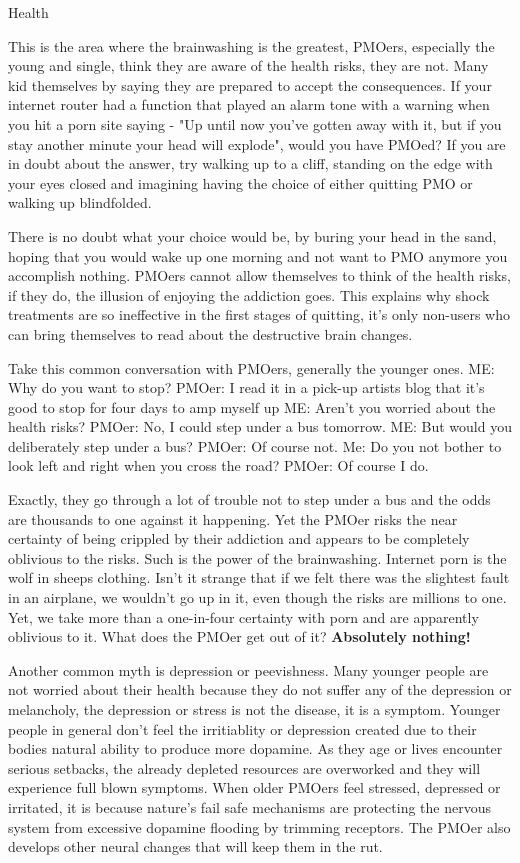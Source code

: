 Health

This is the area where the brainwashing is the greatest, PMOers, especially the young and single, think they are aware of the health risks, they are not. Many kid themselves by saying they are prepared to accept the consequences. If your internet router had a function that played an alarm tone with a warning when you hit a porn site saying - "Up until now you've gotten away with it, but if you stay another minute your head will explode", would you have PMOed? If you are in doubt about the answer, try walking up to a cliff, standing on the edge with your eyes closed and imagining having the choice of either quitting PMO or walking up blindfolded.

There is no doubt what your choice would be, by buring your head in the sand, hoping that you would wake up one morning and not want to PMO anymore you accomplish nothing. PMOers cannot allow themselves to think of the health risks, if they do, the illusion of enjoying the addiction goes. This explains why shock treatments are so ineffective in the first stages of quitting, it's only non-users who can bring themselves to read about the destructive brain changes.

Take this common conversation with PMOers, generally the younger ones.
  ME: Why do you want to stop?
  PMOer: I read it in a pick-up artists blog that it's good to stop for four days to amp myself up
  ME: Aren't you worried about the health risks?
  PMOer: No, I could step under a bus tomorrow.
  ME: But would you deliberately step under a bus?
  PMOer: Of course not.
  Me: Do you not bother to look left and right when you cross the road?
  PMOer: Of course I do.

Exactly, they go through a lot of trouble not to step under a bus and the odds are thousands to one against it happening. Yet the PMOer risks the near certainty of being crippled by their addiction and appears to be completely oblivious to the risks. Such is the power of the brainwashing. Internet porn is the wolf in sheeps clothing. Isn't it strange that if we felt there was the slightest fault in an airplane, we wouldn't go up in it, even though the risks are millions to one. Yet, we take more than a one-in-four certainty with porn and are apparently oblivious to it. What does the PMOer get out of it? \textbf{Absolutely nothing!}

Another common myth is depression or peevishness. Many younger people are not worried about their health because they do not suffer any of the depression or melancholy, the depression or stress is not the disease, it is a symptom. Younger people in general don't feel the irritiablity or depression created due to their bodies natural ability to produce more dopamine. As they age or lives encounter serious setbacks, the already depleted resources are overworked and they will experience full blown symptoms. When older PMOers feel stressed, depressed or irritated, it is because nature's fail safe mechanisms are protecting the nervous system from excessive dopamine flooding by trimming receptors. The PMOer also develops other neural changes that will keep them in the rut.

